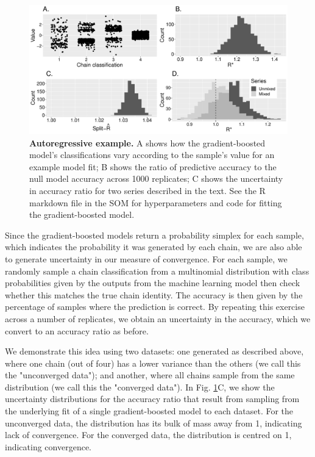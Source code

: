 \documentclass{article}
\begin{document}
\begin{figure}[h]
	\centerline{\includegraphics[width=1.0\textwidth]{../output/ar1.pdf}}
	\caption{\textbf{Autoregressive example.} A shows how the gradient-boosted model's classifications vary according to the sample's value for an example model fit; B shows the ratio of predictive accuracy to the null model accuracy across 1000 replicates; C shows the uncertainty in accuracy ratio for two series described in the text. See the R markdown file in the SOM for hyperparameters and code for fitting the gradient-boosted model.}
	\label{fig:ar1}
\end{figure}

Since the gradient-boosted models return a probability simplex for each sample, which indicates the probability it was generated by each chain, we are also able to generate uncertainty in our measure of convergence. For each sample, we randomly sample a chain classification from a multinomial distribution with class probabilities given by the outputs from the machine learning model then check whether this matches the true chain identity. The accuracy is then given by the percentage of samples where the prediction is correct. By repeating this exercise across a number of replicates, we obtain an uncertainty in the accuracy, which we convert to an accuracy ratio as before.

We demonstrate this idea using two datasets: one generated as described above, where one chain (out of four) has a lower variance than the others (we call this the "unconverged data"); and another, where all chains sample from the same distribution (we call this the "converged data"). In Fig. \ref{fig:ar1}C, we show the uncertainty distributions for the accuracy ratio that result from sampling from the underlying fit of a single gradient-boosted model to each dataset. For the unconverged data, the distribution has its bulk of mass away from 1, indicating lack of convergence. For the converged data, the distribution is centred on 1, indicating convergence. 
\end{document}
